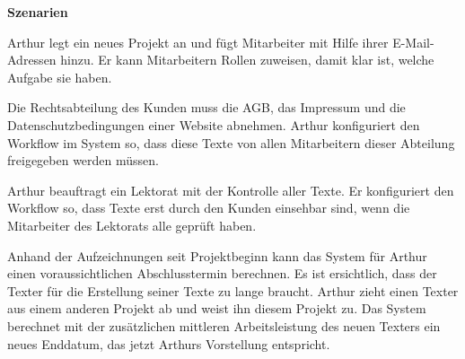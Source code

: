 \begin{multicols}{2}
\textbf{Szenarien}

Arthur legt ein neues Projekt an und fügt Mitarbeiter mit Hilfe ihrer E-Mail-Adressen hinzu. Er kann Mitarbeitern Rollen zuweisen, damit klar ist, welche Aufgabe sie haben. 

Die Rechtsabteilung des Kunden muss die AGB, das Impressum und die Datenschutzbedingungen einer Website abnehmen. Arthur konfiguriert den Workflow im System so, dass diese Texte von allen Mitarbeitern dieser Abteilung freigegeben werden müssen.

Arthur beauftragt ein Lektorat mit der Kontrolle aller Texte. Er konfiguriert den Workflow so, dass Texte erst durch den Kunden einsehbar sind, wenn die Mitarbeiter des Lektorats alle geprüft haben.

Anhand der Aufzeichnungen seit Projektbeginn kann das System für Arthur einen voraussichtlichen Abschlusstermin berechnen. Es ist ersichtlich, dass der Texter für die Erstellung seiner Texte zu lange braucht. Arthur zieht einen Texter aus einem anderen Projekt ab und weist ihn diesem Projekt zu. Das System berechnet mit der zusätzlichen mittleren Arbeitsleistung des neuen Texters ein neues Enddatum, das jetzt Arthurs Vorstellung entspricht.

\end{multicols}

\pagebreak

